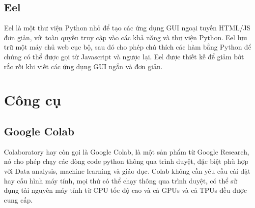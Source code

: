 \subsection{Eel}
Eel là một thư viện Python nhỏ để tạo các ứng dụng GUI ngoại tuyến HTML/JS đơn giản, với toàn quyền truy cập vào các khả năng và thư viện Python. Eel lưu trữ một máy chủ web cục bộ, sau đó cho phép chú thích các hàm bằng Python để chúng có thể được gọi từ Javascript và ngược lại. Eel được thiết kế để giảm bớt rắc rối khi viết các ứng dụng GUI ngắn và đơn giản.

\section{Công cụ}
\subsection{Google Colab}
Colaboratory hay còn gọi là Google Colab, là một sản phẩm từ Google Research, nó cho phép chạy các dòng code python thông qua trình duyệt, đặc biệt phù hợp với Data analysis, machine learning và giáo dục. Colab không cần yêu cầu cài đặt hay cấu hình máy tính, mọi thứ có thể chạy thông qua trình duyệt, có thể sử dụng tài nguyên máy tính từ CPU tốc độ cao và cả GPUs và cả TPUs đều được cung cấp.
